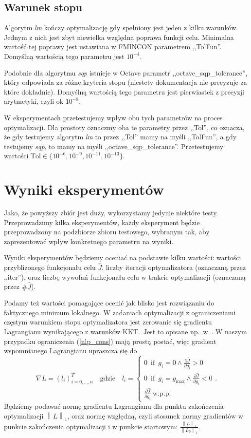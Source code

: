 \documentclass[licencjacka]{pracamgr}
\def\iif{\operatorname{if}}
\newcommand{\norm}[1]{\left\lVert#1\right\rVert}
\begin{document}
\subsection{Warunek stopu}
Algorytm {\it lm\/} kończy optymalizację gdy spełniony jest jeden z kilku warunków. Jednym z nich jest zbyt niewielka względna poprawa funkcji celu. Minimalna wartość tej poprawy jest ustawiana w FMINCON parametrem ,,TolFun''. Domyślną wartością tego parametru jest $10^{-4}$.

Podobnie dla algorytmu {\it sqp\/} istnieje w Octave parametr ,,octave\_sqp\_tolerance'', który odpowiada za różne kryteria stopu (niestety dokumentacja nie precyzuje za które dokładnie). Domyślną wartością tego parametru jest pierwiastek z precyzji arytmetyki, czyli ok $10^{-8}$.

W eksperymentach przetestujemy wpływ obu tych parametrów na proces optymalizacji. Dla prostoty oznaczmy oba te parametry przez ,,Tol'', co oznacza, że gdy testujemy algorytm {\it lm\/} to przez ,,Tol'' mamy na myśli ,,TolFun'', a gdy testujemy {\it sqp}, to mamy na myśli ,,octave\_sqp\_tolerance''. Przetestujemy wartości $\text{Tol} \in \{10^{-6}, 10^{-9}, 10^{-11}, 10^{-13}\}$. 

\section{Wyniki eksperymentów}
Jako, że powyższy zbiór jest duży, wykorzystamy jedynie niektóre testy. Przeprowadzimy kilka eksperymentów, każdy eksperyment będzie przeprowadzony na podzbiorze zbioru testowego, wybranym tak, aby zaprezentować wpływ konkretnego parametru na wyniki.

Wyniki eksperymentów będziemy oceniać na podstawie kilku wartości: wartości przybliżonego funkcjonału celu $\hat{J}$, liczby iteracji optymalizatora (oznaczaną przez ,,iter''), oraz liczbę wywołań funkcjonału celu w trakcie optymalizacji (oznaczaną przez $\#\hat{J}$).

Podamy też wartości pomagające ocenić jak blisko jest rozwiązaniu do faktycznego minimum lokalnego. W zadaniach optymalizacji z ograniczeniami częstym warunkiem stopu optymalizatora jest zerowanie się gradientu Lagrangianu wynikającego z warunków KKT.\ Jest to opisane np.\ w~\cite{diehl}. W naszym przypadku ograniczenia (\ref{nlp_cons}) mają prostą postać, więc gradient wspomnianego Lagrangianu upraszcza się do
\begin{equation}\label{lagrangian}
  \nabla L = {(l_i)}^T_{i = 0,\ldots, n} \quad \text{gdzie} \quad
  l_i = \begin{cases}
    0\ \iif\ g_i = 0 \land \frac{\partial \hat{J}}{\partial g_i} > 0 \\
    0\ \iif\ g_i = g_{\max} \land \frac{\partial \hat{J}}{\partial g_i} < 0 \\
    \frac{\partial \hat{J}}{\partial g_i}\ \text{w.p.p.}
  \end{cases}
  .
\end{equation}
Będziemy podawać normę gradientu Lagrangianu dla punktu zakończenia optymalizacji $\norm{L}_1$, oraz normę względną, czyli stosunek normy gradientów w punkcie zakończenia optymalizacji i w punkcie startowym: $\frac{\norm{L}_1}{\norm{L_0}_1}$.
\end{document}
